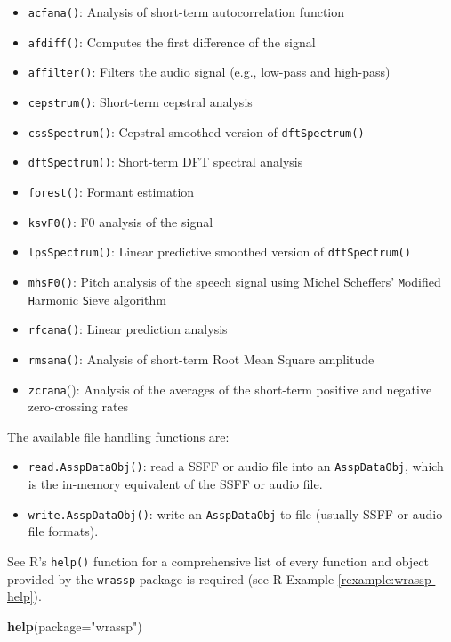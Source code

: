 \documentclass[]{book}
\newenvironment{Shaded}{\begin{snugshade}}{\end{snugshade}}
\newcommand{\DataTypeTok}[1]{\textcolor[rgb]{0.13,0.29,0.53}{#1}}
\newcommand{\KeywordTok}[1]{\textcolor[rgb]{0.13,0.29,0.53}{\textbf{#1}}}
\newcommand{\NormalTok}[1]{#1}
\newcommand{\StringTok}[1]{\textcolor[rgb]{0.31,0.60,0.02}{#1}}
\providecommand{\tightlist}{%
  \setlength{\itemsep}{0pt}\setlength{\parskip}{0pt}}
\theoremstyle{definition}
\theoremstyle{definition}
\theoremstyle{definition}
\theoremstyle{remark}
\begin{document}
\begin{itemize}
\tightlist
\item
  \texttt{acfana()}: Analysis of short-term autocorrelation function
\item
  \texttt{afdiff()}: Computes the first difference of the signal
\item
  \texttt{affilter()}: Filters the audio signal (e.g., low-pass and
  high-pass)
\item
  \texttt{cepstrum()}: Short-term cepstral analysis
\item
  \texttt{cssSpectrum()}: Cepstral smoothed version of
  \texttt{dftSpectrum()}
\item
  \texttt{dftSpectrum()}: Short-term DFT spectral analysis
\item
  \texttt{forest()}: Formant estimation
\item
  \texttt{ksvF0()}: F0 analysis of the signal
\item
  \texttt{lpsSpectrum()}: Linear predictive smoothed version of
  \texttt{dftSpectrum()}
\item
  \texttt{mhsF0()}: Pitch analysis of the speech signal using Michel
  Scheffers' \texttt{M}odified \texttt{H}armonic \texttt{S}ieve
  algorithm
\item
  \texttt{rfcana()}: Linear prediction analysis
\item
  \texttt{rmsana()}: Analysis of short-term Root Mean Square amplitude
\item
  \texttt{zcrana}(): Analysis of the averages of the short-term positive
  and negative zero-crossing rates
\end{itemize}

The available file handling functions are:

\begin{itemize}
\tightlist
\item
  \texttt{read.AsspDataObj()}: read a SSFF or audio file into an
  \texttt{AsspDataObj}, which is the in-memory equivalent of the SSFF or
  audio file.
\item
  \texttt{write.AsspDataObj()}: write an \texttt{AsspDataObj} to file
  (usually SSFF or audio file formats).
\end{itemize}

See R's \texttt{help()} function for a comprehensive list of every
function and object provided by the \texttt{wrassp} package is required
(see R Example \ref{rexample:wrassp-help}).

\begin{Shaded}
\begin{Highlighting}[]
\KeywordTok{help}\NormalTok{(}\DataTypeTok{package=}\StringTok{"wrassp"}\NormalTok{)}
\end{Highlighting}
\end{Shaded}
\end{document}
